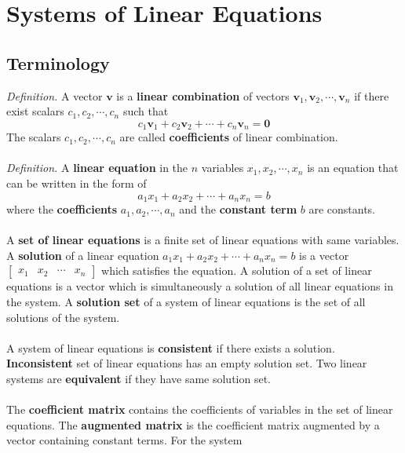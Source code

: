 \chapter{Systems of Linear Equations}

\section{Terminology}
\textit{Definition.} A vector $\textbf{v}$ is a \textbf{linear combination} of vectors $\textbf{v}_1, \textbf{v}_2, \cdots, \textbf{v}_n$ if there exist scalars $c_1, c_2, \cdots, c_n$ such that
\begin{displaymath}
	c_1\textbf{v}_1 + c_2\textbf{v}_2 + \cdots + c_n\textbf{v}_n = \textbf{0}
\end{displaymath}
The scalars $c_1, c_2, \cdots, c_n$ are called \textbf{coefficients} of linear combination.
\\\\
\textit{Definition.} A \textbf{linear equation} in the $n$ variables $x_1, x_2, \cdots, x_n$ is an equation that can be written in the form of
\begin{displaymath}
	a_1x_1 + a_2x_2 + \cdots + a_nx_n = b
\end{displaymath}
where the \textbf{coefficients} $a_1, a_2, \cdots, a_n$ and the \textbf{constant term} $b$ are constants.
\\\\
A \textbf{set of linear equations} is a finite set of linear equations with same variables. A \textbf{solution} of a linear equation $a_1x_1 + a_2x_2 + \cdots + a_nx_n = b$ is a vector $\begin{bmatrix}
	x_1 & x_2 & \cdots & x_n
\end{bmatrix}$ which satisfies the equation. A solution of a set of linear equations is a vector which is simultaneously a solution of all linear equations in the system. A \textbf{solution set} of a system of linear equations is the set of all solutions of the system.
\\\\
A system of linear equations is \textbf{consistent} if there exists a solution. \textbf{Inconsistent} set of linear equations has an empty solution set.
\noindent Two linear systems are \textbf{equivalent} if they have same solution set.
\\\\
\noindent The \textbf{coefficient matrix} contains the coefficients of variables in the set of linear equations. The \textbf{augmented matrix} is the coefficient matrix augmented by a vector containing constant terms. For the system
